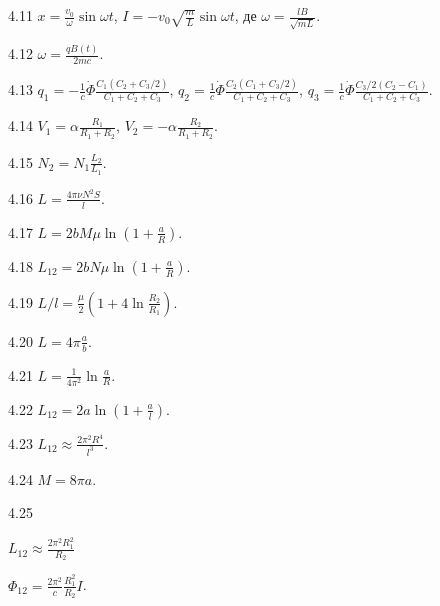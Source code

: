 \begin{Solution}{4.{11}}
	$x = \frac{v_0}{\omega}\sin\omega t$,
	$I = -v_0\sqrt{\frac{m}{L}}\sin\omega t$,
	де $\omega = \frac{lB}{\sqrt{mL}}$.
\end{Solution}
\begin{Solution}{4.{12}}
	$\omega = \frac{qB(t)}{2mc}$.
\end{Solution}
\begin{Solution}{4.{13}}
	$q_1 = - \frac1c \dot{\Phi}\frac{C_1(C_2 + C_3/2)}{C_1 + C_2 +C_3}$, $q_2 =  \frac1c \dot{\Phi}\frac{C_2(C_1 + C_3/2)}{C_1 + C_2 +C_3}$, $q_3 =  \frac1c \dot{\Phi}\frac{C_3/2(C_2 - C_1)}{C_1 + C_2 +C_3}$.
\end{Solution}
\begin{Solution}{4.{14}}
	$V_1 = \alpha \frac{R_1}{R_1 + R_2}$, $V_2 = - \alpha \frac{R_2}{R_1 + R_2}$.
\end{Solution}
\begin{Solution}{4.{15}}
$N_2 = N_1 \frac{L_2}{L_1}$.
\end{Solution}
\begin{Solution}{4.{16}}
	$L = \frac{4\pi\nu N^2 S}{l}$.
\end{Solution}
\begin{Solution}{4.{17}}
	$L  = 2bM\mu\ln\left( 1 + \frac{a}{R}\right) $.
\end{Solution}
\begin{Solution}{4.{18}}
	$L_{12} = 2bN\mu \ln\left( 1 + \frac{a}{R}\right) $.
\end{Solution}
\begin{Solution}{4.{19}}
	$L/l = \frac{\mu}{2} \left( 1 + 4\ln\frac{R_2}{R_1}\right)$.
\end{Solution}
\begin{Solution}{4.{20}}
	$L = 4\pi\frac{a}{b}$.
\end{Solution}
\begin{Solution}{4.{21}}
	$L = \frac{1}{4\pi^2}\ln\frac{a}{R}$.
\end{Solution}
\begin{Solution}{4.{22}}
	$L_{12} = 2a\ln\left( 1 + \frac{a}{l}\right).$
\end{Solution}
\begin{Solution}{4.{23}}
	$L_{12} \approx \frac{2\pi^2R^4}{l^3}$.
\end{Solution}
\begin{Solution}{4.{24}}
	$M = 8\pi a$.
\end{Solution}
\begin{Solution}{4.{25}}
		\begin{enumerate*}[label=\alph*)]
		\item $L_{12} \approx \frac{2\pi^2R_1^2}{R_2}$
		\item $\Phi_{12} = \frac{2\pi^2}{c} \frac{R_1^2}{R_2} I$.
		\end{enumerate*}
\end{Solution}

